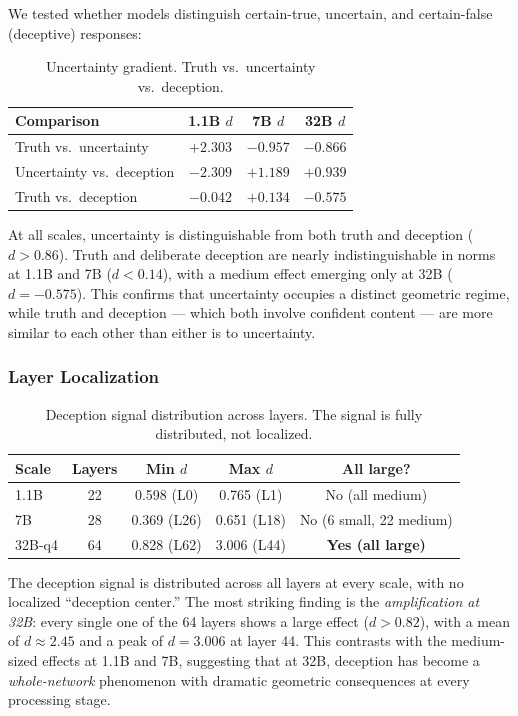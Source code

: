 \documentclass[11pt,a4paper]{article}
\begin{document}
We tested whether models distinguish certain-true, uncertain, and certain-false (deceptive) responses:

\begin{table}[H]
\centering
\caption{Uncertainty gradient. Truth vs.\ uncertainty vs.\ deception.}
\label{tab:uncertainty}
\begin{tabular}{lccc}
\toprule
\textbf{Comparison} & \textbf{1.1B $d$} & \textbf{7B $d$} & \textbf{32B $d$} \\
\midrule
Truth vs.\ uncertainty & $+2.303$ & $-0.957$ & $-0.866$ \\
Uncertainty vs.\ deception & $-2.309$ & $+1.189$ & $+0.939$ \\
Truth vs.\ deception & $-0.042$ & $+0.134$ & $-0.575$ \\
\bottomrule
\end{tabular}
\end{table}

At all scales, uncertainty is distinguishable from both truth and deception ($d > 0.86$). Truth and deliberate deception are nearly indistinguishable in norms at 1.1B and 7B ($d < 0.14$), with a medium effect emerging only at 32B ($d = -0.575$). This confirms that uncertainty occupies a distinct geometric regime, while truth and deception --- which both involve confident content --- are more similar to each other than either is to uncertainty.

\subsubsection{Layer Localization}

\begin{table}[H]
\centering
\caption{Deception signal distribution across layers. The signal is fully distributed, not localized.}
\label{tab:deception_layers}
\begin{tabular}{lcccc}
\toprule
\textbf{Scale} & \textbf{Layers} & \textbf{Min $d$} & \textbf{Max $d$} & \textbf{All large?} \\
\midrule
1.1B & 22 & 0.598 (L0) & 0.765 (L1) & No (all medium) \\
7B & 28 & 0.369 (L26) & 0.651 (L18) & No (6 small, 22 medium) \\
32B-q4 & 64 & 0.828 (L62) & 3.006 (L44) & \textbf{Yes (all large)} \\
\bottomrule
\end{tabular}
\end{table}

The deception signal is distributed across all layers at every scale, with no localized ``deception center.'' The most striking finding is the \emph{amplification at 32B}: every single one of the 64 layers shows a large effect ($d > 0.82$), with a mean of $d \approx 2.45$ and a peak of $d = 3.006$ at layer 44. This contrasts with the medium-sized effects at 1.1B and 7B, suggesting that at 32B, deception has become a \emph{whole-network} phenomenon with dramatic geometric consequences at every processing stage.
\end{document}
